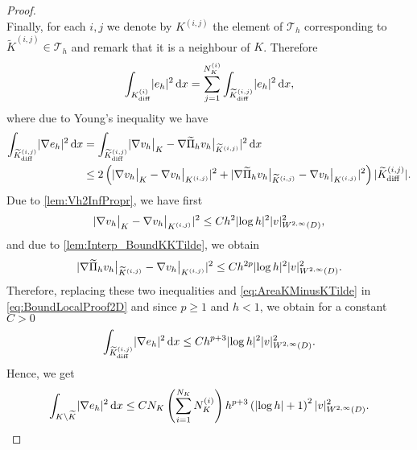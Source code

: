 \begin{proof}
\begin{equation}
	\end{equation}
	Finally, for each $i,j$ we denote by $K^{(i,j)}$ the element of $\mathcal T_h$ corresponding to $\widetilde K^{(i,j)} \in \mathcal T_h$ and remark that it is a neighbour of $K$. Therefore
	\begin{equation}
		\int_{K_{\mathrm{diff}}^{(i)}}\lvert e_h\rvert^2 \,\mathrm{d} x = \sum_{j=1}^{N_K^{(i)}} \int_{\widetilde K_{\mathrm{diff}}^{(i,j)}}\lvert e_h\rvert^2 \,\mathrm{d} x,
	\end{equation}
	where due to Young's inequality we have 
	\begin{equation}\label{eq:BoundLocalProof2D}
	\begin{aligned}
		\int_{\widetilde K_{\mathrm{diff}}^{(i,j)}}\lvert\nabla  e_h\rvert^2 \,\mathrm{d} x &= \int_{\widetilde K_{\mathrm{diff}}^{(i,j)}} \lvert\nabla v_h\bigr\rvert_{K} - \nabla \widetilde \Pi_h v_h\bigr\rvert_{\widetilde K^{(i,j)}}\rvert^2 \,\mathrm{d} x \\
		&\leq 2\left(\lvert\nabla v_h\bigr\rvert_{K} - \nabla v_h\bigr\rvert_{K^{(i,j)}}\rvert^2 + \lvert\nabla \widetilde \Pi_h v_h\bigr\rvert_{\widetilde K^{(i,j)}} - \nabla v_h\bigr\rvert_{K^{(i,j)}}\rvert^2\right) \lvert\widetilde K_{\mathrm{diff}}^{(i,j)}\rvert.
	\end{aligned}
	\end{equation}
	Due to \cref{lem:Vh2InfPropr}, we have first
	\begin{equation}
		\lvert\nabla v_h\bigr\rvert_{K} - \nabla v_h\bigr\rvert_{K^{(i,j)}}\rvert^2 \leq C h^2 \lvert\log h\rvert^2 \lvert v\rvert_{W^{2, \infty}(D)}^2,
	\end{equation}
	and due to \cref{lem:Interp_BoundKKTilde}, we obtain
	\begin{equation}
		\lvert\nabla \widetilde \Pi_h v_h\bigr\rvert_{\widetilde K^{(i,j)}} - \nabla v_h\bigr\rvert_{K^{(i,j)}}\rvert^2 \leq C h^{2p} \lvert\log h\rvert^2 \lvert v\rvert_{W^{2, \infty}(D)}^2.
	\end{equation}
	Therefore, replacing these two inequalities and \eqref{eq:AreaKMinusKTilde} in \eqref{eq:BoundLocalProof2D} and since $p\geq 1$ and $h < 1$, we obtain for a constant $C > 0$
	\begin{equation}
		\int_{\widetilde K_{\mathrm{diff}}^{(i,j)}}\lvert\nabla  e_h\rvert^2 \,\mathrm{d} x \leq C h^{p+3} \lvert\log h\rvert^2 \lvert v\rvert_{W^{2, \infty}(D)}^2.
	\end{equation}
	Hence, we get
	\begin{equation}\label{eq:IntegralKMinusKTilde}
		\int_{K \setminus \widetilde K} \lvert\nabla  e_h\rvert^2 \,\mathrm{d} x\leq C N_K \left(\sum_{i=1}^{N_K} N_K^{(i)} \right)h^{p+3} \left(\lvert\log h\rvert + 1\right)^2 \lvert v\rvert_{W^{2, \infty}(D)}^2.
	\end{equation}

\end{proof}
